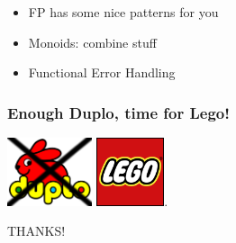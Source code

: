 \documentclass{beamer}
\begin{document}
\begin{frame}
  \begin{itemize}
  \item FP has some nice patterns for you
  \item Monoids: combine stuff
  \item Functional Error Handling
  \end{itemize}
\end{frame}

\begin{frame}
  \frametitle{Enough Duplo, time for Lego!}
  \begin{center}
    \includegraphics[height=2cm]{../images/duplo-logo-crossed.png}
    \hspace{2cm} \includegraphics[height=2cm]{../images/lego-logo}.
  \end{center}
  \vfill
  \begin{center}
    {\Huge THANKS!}
  \end{center}
\end{frame}
\end{document}
